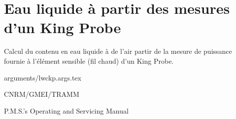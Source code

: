 %
\section{Eau liquide \`a partir des mesures d'un King Probe}

 

Calcul du contenu en eau liquide \`a  de l'air
partir de la mesure de puissance fournie \`a 
l'\'el\'ement sensible (fil chaud) d'un King Probe.


\bigskip
 {arguments/lwckp.args.tex}




CNRM/GMEI/TRAMM

P.M.S.'s Operating and Servicing Manual \cite{King}
